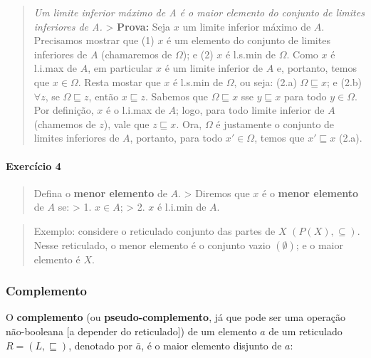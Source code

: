 \begin{quote}
\emph{Um limite inferior máximo de A é o maior elemento do conjunto de
limites inferiores de A.} \textgreater{} \textbf{Prova:} Seja \(x\) um
limite inferior máximo de \(A\). Precisamos mostrar que (1) \(x\) é um
elemento do conjunto de limites inferiores de \(A\) (chamaremos de
\(\Omega\)); e (2) \(x\) é l.s.min de \(\Omega\). Como \(x\) é l.i.max
de \(A\), em particular \(x\) é um limite inferior de \(A\) e, portanto,
temos que \(x \in \Omega\). Resta mostar que \(x\) é l.s.min de
\(\Omega\), ou seja: (2.a) \(\Omega \sqsubseteq x\); e (2.b)
\(\forall z\), se \(\Omega \sqsubseteq z\), então \(x \sqsubseteq z\).
Sabemos que \(\Omega \sqsubseteq x\) sse \(y \sqsubseteq x\) para todo
\(y \in \Omega\). Por definição, \(x\) é o l.i.max de \(A\); logo, para
todo limite inferior de \(A\) (chamemos de \(z\)), vale que
\(z \sqsubseteq x\). Ora, \(\Omega\) é justamente o conjunto de limites
inferiores de \(A\), portanto, para todo \(x' \in \Omega\), temos que
\(x' \sqsubseteq x\) (2.a).
\end{quote}

\hypertarget{exercuxedcio-4}{%
\paragraph{Exercício 4}\label{exercuxedcio-4}}

\begin{quote}
Defina o \textbf{menor elemento} de \(A\). \textgreater{} Diremos que
\(x\) é o \textbf{menor elemento} de \(A\) se: \textgreater{} 1.
\(x \in A\); \textgreater{} 2. \(x\) é l.i.min de \(A\).
\end{quote}

\begin{quote}
Exemplo: considere o reticulado conjunto das partes de \(X\)
\((P(X), \subseteq)\). Nesse reticulado, o menor elemento é o conjunto
vazio \((\emptyset)\); e o maior elemento é \(X\).
\end{quote}

\hypertarget{complemento}{%
\subsubsection{Complemento}\label{complemento}}

O \textbf{complemento} (ou \textbf{pseudo-complemento}, já que pode ser
uma operação não-booleana {[}a depender do reticulado{]}) de um elemento
\(a\) de um reticulado \(R = (L, \sqsubseteq)\), denotado por
\(\bar{a}\), é o maior elemento disjunto de \(a\):

